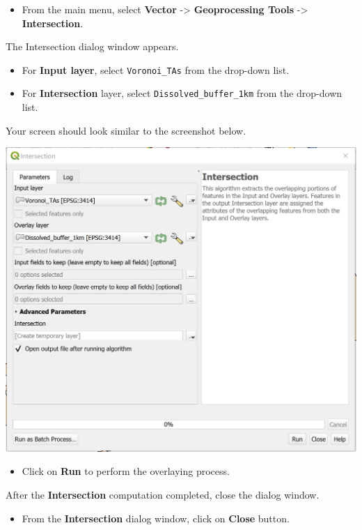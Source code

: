 \documentclass[
  letterpaper,
  DIV=11,
  numbers=noendperiod]{scrreprt}
\providecommand{\tightlist}{%
  \setlength{\itemsep}{0pt}\setlength{\parskip}{0pt}}\usepackage{longtable,booktabs,array}
\begin{document}
\begin{itemize}
\tightlist
\item
  From the main menu, select \textbf{Vector} -\textgreater{}
  \textbf{Geoprocessing Tools} -\textgreater{} \textbf{Intersection}.
\end{itemize}

The Intersection dialog window appears.

\begin{itemize}
\tightlist
\item
  For \textbf{Input layer}, select \texttt{Voronoi\_TAs} from the
  drop-down list.
\item
  For \textbf{Intersection} layer, select
  \texttt{Dissolved\_buffer\_1km} from the drop-down list.
\end{itemize}

Your screen should look similar to the screenshot below.

\includegraphics{./img05/image24.jpg}

\begin{itemize}
\tightlist
\item
  Click on \textbf{Run} to perform the overlaying process.
\end{itemize}

After the \textbf{Intersection} computation completed, close the dialog
window.

\begin{itemize}
\tightlist
\item
  From the \textbf{Intersection} dialog window, click on \textbf{Close}
  button.
\end{itemize}
\end{document}
